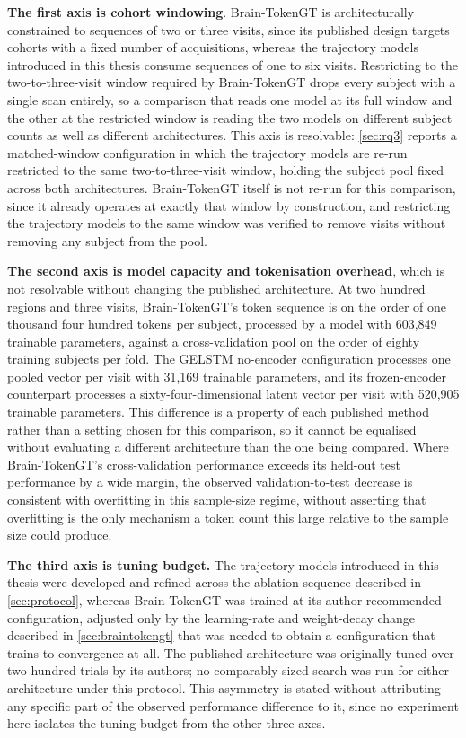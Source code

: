 \textbf{The first axis is cohort windowing}. Brain-TokenGT is architecturally constrained to
sequences of two or three visits, since its published design targets cohorts with a fixed
number of acquisitions, whereas the trajectory models introduced in this thesis consume
sequences of one to six visits. Restricting to the two-to-three-visit window required by
Brain-TokenGT drops every subject with a single scan entirely, so a comparison that reads
one model at its full window and the other at the restricted window is reading the two
models on different subject counts as well as different architectures. This axis is
resolvable: \autoref{sec:rq3} reports a matched-window configuration in which the trajectory models
are re-run restricted to the same two-to-three-visit window, holding the subject pool fixed
across both architectures. Brain-TokenGT itself is not re-run for this comparison, since it
already operates at exactly that window by construction, and restricting the trajectory
models to the same window was verified to remove visits without removing any subject from
the pool.

\textbf{The second axis is model capacity and tokenisation overhead}, which is not resolvable
without changing the published architecture. At two hundred regions and three visits,
Brain-TokenGT's token sequence is on the order of one thousand four hundred tokens per
subject, processed by a model with 603{,}849 trainable parameters, against a cross-validation
pool on the order of eighty training subjects per fold. The \ac{GELSTM} no-encoder configuration processes
one pooled vector per visit with 31{,}169 trainable parameters, and its frozen-encoder
counterpart processes a sixty-four-dimensional latent vector per visit with 520{,}905
trainable parameters. This difference is a property of each published method rather than a
setting chosen for this comparison, so it cannot be equalised without evaluating a
different architecture than the one being compared. Where Brain-TokenGT's cross-validation
performance exceeds its held-out test performance by a wide margin, the observed
validation-to-test decrease is consistent with overfitting in this sample-size regime,
without asserting that overfitting is the only mechanism a token count this large relative
to the sample size could produce.

\textbf{The third axis is tuning budget.} The trajectory models introduced in this thesis were
developed and refined across the ablation sequence described in \autoref{sec:protocol},
whereas Brain-TokenGT was trained at its author-recommended configuration, adjusted only by
the learning-rate and weight-decay change described in \autoref{sec:braintokengt} that was
needed to obtain a configuration that trains to convergence at all. The published
architecture was originally tuned over two hundred trials by its authors; no comparably
sized search was run for either architecture under this protocol. This asymmetry is stated
without attributing any specific part of the observed performance difference to it, since
no experiment here isolates the tuning budget from the other three axes.

